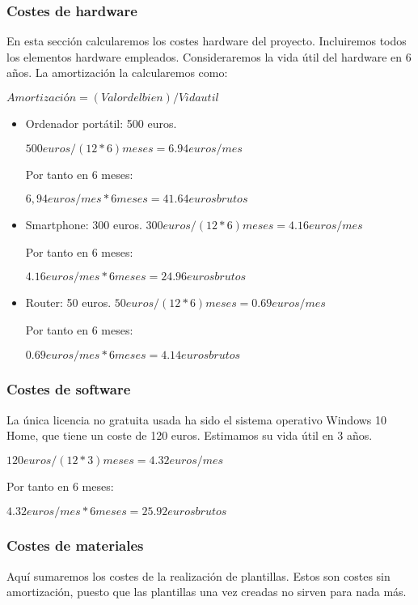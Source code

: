 \subsubsection{Costes de hardware}
En esta sección calcularemos los costes hardware del proyecto. Incluiremos todos los elementos hardware empleados. Consideraremos la vida útil del hardware en 6 años.
La amortización la calcularemos como:

$Amortización = (Valor del bien)/Vida util$


\begin{itemize}
	\item Ordenador portátil: 500 euros.
	
	$500 euros/(12*6)meses = 6.94 euros/mes$
	
	Por tanto en 6 meses:
	
	$6,94 euros/mes * 6 meses = 41.64 euros brutos$
	
	\item Smartphone: 300 euros.
	$300 euros/(12*6)meses = 4.16 euros/mes$
	
	Por tanto en 6 meses:
	
	$4.16 euros/mes * 6 meses = 24.96 euros brutos$
	
	\item Router: 50 euros.
	$50 euros/(12*6)meses = 0.69 euros/mes$
	
	Por tanto en 6 meses:
	
	$0.69 euros/mes * 6 meses = 4.14 euros brutos$
	
\end{itemize}

\subsubsection{Costes de software}
La única licencia no gratuita usada ha sido el sistema operativo Windows 10 Home, que tiene un coste de 120 euros. Estimamos su vida útil en 3 años.

$120 euros/(12*3)meses = 4.32 euros/mes$
	
Por tanto en 6 meses:
	
$4.32 euros/mes * 6 meses = 25.92 euros brutos$

\subsubsection{Costes de materiales}
Aquí sumaremos los costes de la realización de plantillas. Estos son costes sin amortización, puesto que las plantillas una vez creadas no sirven para nada más.

